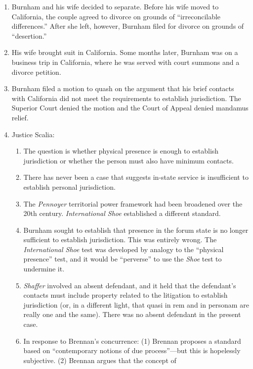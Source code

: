 \begin{enumerate}
    \item Burnham and his wife decided to separate. Before his wife moved to 
    California, the couple agreed to divorce on grounds of ``irreconcilable 
    differences.'' After she left, however, Burnham filed for divorce on 
    grounds of ``desertion.''
    \item His wife brought suit in California. Some months later, Burnham was 
    on a business trip in California, where he was served with court summons 
    and a divorce petition.
    \item Burnham filed a motion to quash on the argument that his brief 
    contacts with California did not meet the requirements to establish 
    jurisdiction. The Superior Court denied the motion and the Court of Appeal 
    denied mandamus relief.
    \item Justice Scalia:
    \begin{enumerate}
        \item The question is whether physical presence is enough to establish 
        jurisdiction or whether the person must also have minimum contacts.
        \item There has never been a case that suggests in-state service is 
        insufficient to establish personal jurisdiction.
        \item The \emph{Pennoyer} territorial power framework had been 
        broadened over the 20th century. \emph{International Shoe} established 
        a different standard.
        \item Burnham sought to establish that presence in the forum state is no 
        longer sufficient to establish jurisdiction. This was entirely wrong. 
        The \emph{International Shoe} test was developed by analogy to the 
        ``physical presence'' test, and it would be ``perverse'' to use the 
        \emph{Shoe} test to undermine it.
        \item \emph{Shaffer} involved an absent defendant, and it held that 
        the defendant's contacts must include property related to the 
        litigation to establish jurisdiction (or, in a different light, that 
        quasi in rem and in personam are really one and the same). There was 
        no absent defendant in the present case.
        \item In response to Brennan's concurrence: (1) Brennan proposes a 
        standard based on ``contemporary notions of due process''---but this 
        is hopelessly subjective. (2) Brennan argues that the concept of 

\end{enumerate}
\end{enumerate}
